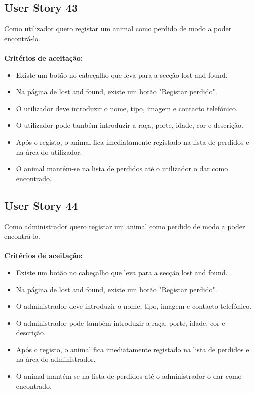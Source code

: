 \documentclass[a4paper,11pt]{article}
\begin{document}
\subsection*{User Story 43}
Como utilizador quero registar um animal como perdido de modo a poder encontrá-lo.\\\\
\textbf{Critérios de aceitação:}
\begin{itemize}
  \item Existe um botão no cabeçalho que leva para a secção lost and found.
  \item Na página de lost and found, existe um botão "Registar perdido".
  \item O utilizador deve introduzir o nome, tipo, imagem e contacto telefónico.
  \item O utilizador pode também introduzir a raça, porte, idade, cor e descrição.
  \item Após o registo, o animal fica imediatamente registado na lista de perdidos e na área do utilizador.
  \item O animal mantém-se na lista de perdidos até o utilizador o dar como encontrado.
\end{itemize}

\subsection*{User Story 44}
Como administrador quero registar um animal como perdido de modo a poder encontrá-lo.\\\\
\textbf{Critérios de aceitação:}
\begin{itemize}
  \item Existe um botão no cabeçalho que leva para a secção lost and found.
  \item Na página de lost and found, existe um botão "Registar perdido".
  \item O administrador deve introduzir o nome, tipo, imagem e contacto telefónico.
  \item O administrador pode também introduzir a raça, porte, idade, cor e descrição.
  \item Após o registo, o animal fica imediatamente registado na lista de perdidos e na área do administrador.
  \item O animal mantém-se na lista de perdidos até o administrador o dar como encontrado.
\end{itemize}
\end{document}
